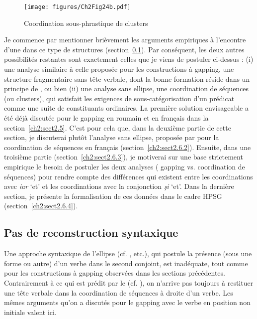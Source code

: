 \begin{figure} 

\texttt{[image: figures/Ch2Fig24b.pdf]}%

\caption{Coordination sous-phrastique de  clusters}
\label{ch2:fig24b}
\end{figure}

Je commence par mentionner brièvement les arguments empiriques à l’encontre d’une  dans ce type de structures (section~\ref{ch2:sect2.6.1}). Par conséquent, les deux autres possibilités restantes sont exactement celles que je viens de postuler ci-dessus : (i) une analyse similaire à celle proposée pour les constructions à gapping, {\cad} une structure fragmentaire sans tête verbale, dont la bonne formation réside dans un principe de , ou bien (ii) une analyse sans ellipse, {\cad} une coordination de séquences (ou clusters), qui satisfait les exigences de sous-catégorisation d’un prédicat comme une suite de constituants ordinaires. La première solution envisageable a été déjà discutée pour le gapping en roumain et en français dans la section~\ref{ch2:sect2.5}. C’est pour cela que, dans la deuxième partie de cette section, je discuterai plutôt l’analyse sans ellipse, proposée par \citet{Mouret2006,Mouret2007,Mouret2008} pour la coordination de séquences en français (section~\ref{ch2:sect2.6.2}). Ensuite, dans une troisième partie (section~\ref{ch2:sect2.6.3}), je motiverai sur une base strictement empirique le besoin de postuler les deux analyses ({\cad} gapping vs. coordination de séquences) pour rendre compte des différences qui existent entre les coordinations avec \textit{iar} ‘et’ et les coordinations avec la conjonction \textit{şi} ‘et’. Dans la dernière section, je présente la formalisation de ces données dans le cadre HPSG (section~\ref{ch2:sect2.6.4}).    


\subsection{Pas de reconstruction syntaxique} \label{ch2:sect2.6.1}


Une approche syntaxique de l’ellipse (cf. \citealt{vanOirsouw1987,Wilder1997,Crysmann2003,BeaversEtAl2004,ChavesEtAl2008}, etc.), qui postule la présence (sous une forme ou autre) d’un verbe dans le second conjoint, est inadéquate, tout comme pour les constructions à gapping observées dans les sections précédentes. Contrairement à ce qui est prédit par le  (cf. \citealt{Chomsky1964}), on n’arrive pas toujours à restituer une tête verbale dans la coordination de séquences à droite d’un verbe. Les mêmes arguments qu’on a discutés pour le gapping avec le verbe en position non initiale valent ici. 

